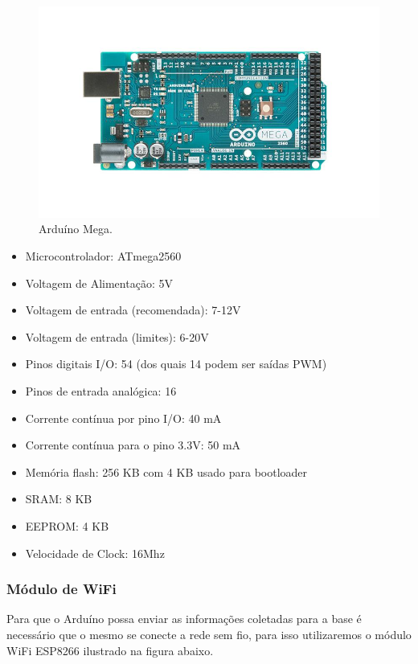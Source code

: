     \begin{figure}[H]                                                  
      \centering                                                       
      \includegraphics[scale=0.4]{figuras/arduino_mega.png} 
      \caption{Arduíno Mega.}                  
      \label{img:arduino_mega}                                             
    \end{figure}                                                       

    \begin{itemize}
      \item Microcontrolador: ATmega2560
      \item Voltagem de Alimentação: 5V
      \item Voltagem de entrada (recomendada): 7-12V
      \item Voltagem de entrada (limites): 6-20V
      \item Pinos digitais I/O: 54 (dos quais 14 podem ser saídas PWM)
      \item Pinos de entrada analógica: 16
      \item Corrente contínua por pino I/O: 40 mA
      \item Corrente contínua para o pino 3.3V: 50 mA
      \item Memória flash: 256 KB com 4 KB usado para bootloader
      \item SRAM: 8 KB
      \item EEPROM: 4 KB
      \item Velocidade de Clock: 16Mhz
    \end{itemize}
  
  \subsubsection{Módulo de WiFi}
  \label{sub:Modulo_de_wifi}
    Para que o Arduíno possa enviar as informações coletadas para a base é necessário que o mesmo se conecte a rede sem fio, para isso utilizaremos o módulo WiFi ESP8266 ilustrado na figura abaixo.

